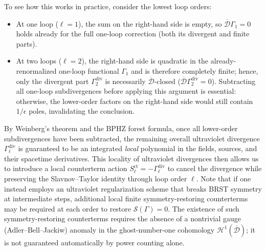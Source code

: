 To see how this works in practice, consider the lowest loop orders:
\begin{itemize}
    \item At one loop (\(\ell = 1\)), the sum on the right-hand side is empty, so \(\overline{\mathcal{D}}\Gamma_1 = 0\) holds already for the full one-loop correction (both its divergent and finite parts).
    \item At two loops (\(\ell = 2\)), the right-hand side is quadratic in the already-renormalized one-loop functional \(\Gamma_1\) and is therefore completely finite; hence, only the divergent part \(\Gamma_2^{\text{div}}\) is necessarily \(\overline{\mathcal{D}}\)-closed (\(\overline{\mathcal{D}}\Gamma_2^{\text{div}} = 0\)). Subtracting all one-loop subdivergences before applying this argument is essential: otherwise, the lower-order factors on the right-hand side would still contain \(1/\epsilon\) poles, invalidating the conclusion.
\end{itemize}

By Weinberg's theorem and the BPHZ forest formula, once all lower-order subdivergences have been subtracted, the remaining overall ultraviolet divergence \(\Gamma_\ell^{\text{div}}\) is guaranteed to be an integrated \textit{local} polynomial in the fields, sources, and their spacetime derivatives. This locality of ultraviolet divergences then allows us to introduce a local counterterm action \(S_{\ell}^{\text{ct}} = -\Gamma_\ell^{\text{div}}\) to cancel the divergence while preserving the Slavnov--Taylor identity through loop order \(\ell\). Note that if one instead employs an ultraviolet regularization scheme that breaks BRST symmetry at intermediate steps, additional local finite symmetry-restoring counterterms may be required at each order to restore \(\mathcal{S}(\Gamma) = 0\). The existence of such symmetry-restoring counterterms requires the absence of a nontrivial gauge (Adler--Bell--Jackiw) anomaly in the ghost-number-one cohomology \(\mathcal{H}^1(\overline{\mathcal{D}})\); it is not guaranteed automatically by power counting alone.

